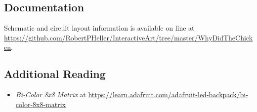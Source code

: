 \subsection*{Documentation}

Schematic and circuit layout information is available on line at 
\url{https://github.com/RobertPHeller/InteractiveArt/tree/master/WhyDidTheChicken}.

\subsection*{Additional Reading}

\begin{itemize}
\item \textit{Bi-Color 8x8 Matrix} at 
\url{https://learn.adafruit.com/adafruit-led-backpack/bi-color-8x8-matrix} 
\end{itemize}
